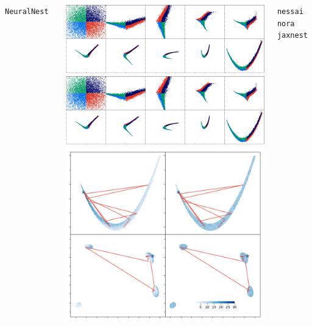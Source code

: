\documentclass[aspectratio=169,handout]{beamer}
\begin{document}
\begin{frame}
\begin{columns}[t]
        \vfill
        \texttt{NeuralNest}~
        \begin{columns}
            \includegraphics[width=\textwidth]{figures/rosenbrock_flow.png}
            \includegraphics[width=\textwidth]{figures/himmelblau_flow.png}
            \includegraphics[width=\textwidth]{figures/chains.png}
        \end{columns}
        \texttt{nessai}~ \texttt{nora}~ \texttt{jaxnest}~

\end{columns}
\end{frame}
\end{document}
